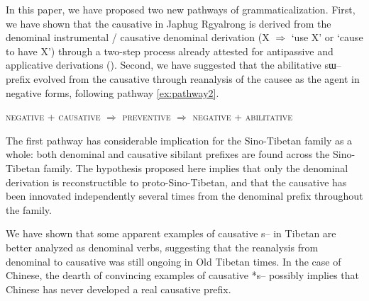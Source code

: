 \documentclass[oldfontcommands,oneside,a4paper,11pt]{article}
\newcommand{\ipa}[1]{{\phon \mbox{#1}}} %
\begin{document}
In this paper, we have proposed two new pathways of grammaticalization. First, we have shown that the causative in Japhug Rgyalrong is derived from the denominal instrumental  / causative denominal derivation (X $\Rightarrow$ `use X' or `cause to have X') through a two-step process already attested for antipassive and applicative derivations (\citealt{jacques14antipassive}). Second, we have suggested that the abilitative \ipa{sɯ--} prefix evolved from the causative through reanalysis of the causee as the agent in negative forms, following pathway \ref{ex:pathway2}.

\begin{exe}
\ex \label{ex:pathway2}
\glt \textsc{negative}   + \textsc{causative} $\Rightarrow$ \textsc{preventive} $\Rightarrow$ \textsc{negative} +  \textsc{abilitative} 
\end{exe}

The first pathway has considerable implication for the Sino-Tibetan family as a whole: both denominal and causative sibilant prefixes are found across the Sino-Tibetan family. The hypothesis proposed here implies that only the denominal derivation is reconstructible to proto-Sino-Tibetan, and that the causative has been innovated independently several times from the denominal prefix throughout the family. 

We have shown that  some apparent examples of causative \ipa{s--} in Tibetan are better analyzed as denominal verbs, suggesting that the reanalysis from denominal to causative was still ongoing in Old Tibetan times. In the case of Chinese, the dearth of convincing examples of causative *\ipa{s--} possibly implies that Chinese has never developed a real causative prefix.



\end{document}
